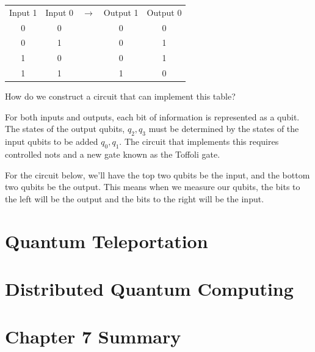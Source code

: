 \documentclass{book}
\begin{document}
\begin{center}
\begin{tabular}{ | c | c | c | c | c |}

 Input 1 & Input 0 & $\rightarrow{}$ & Output 1 & Output 0 \\ 
  
 0 & 0 &  & 0 & 0 \\ 
 
 0 & 1 &  & 0 & 1 \\
 
 1 & 0 &  & 0 & 1 \\
 
 1 & 1 &  & 1 & 0 \\
 
  
\end{tabular}
\end{center}


How do we construct a circuit that can implement this table? 

For both inputs and outputs, each bit of information is represented as a qubit. The states of the output qubits, $q_2, q_3$ must be determined by the states of the input qubits to be added $q_0, q_1$. The circuit that implements this requires controlled nots and a new gate known as the Toffoli gate.

For the circuit below, we'll have the top two qubits be the input, and the bottom two qubits be the output. This means when we measure our qubits, the bits to the left will be the output and the bits to the right will be the input. 


\section{Quantum Teleportation}


\section{Distributed Quantum Computing}


\section{Chapter 7 Summary}
\end{document}

